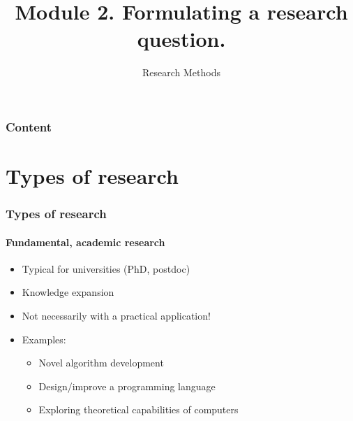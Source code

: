 \documentclass[aspectratio=169]{beamer}
\title{Module 2. Formulating a research question.}
\subtitle{Research Methods}
\author{\lecturers}   %
\date{\academicyear}
\begin{document}
    
    \begin{frame}
        \maketitle
    \end{frame}
    
    \begin{frame}
        \frametitle{Content}
        
        \tableofcontents
    \end{frame}
    
    \section{Types of research}
    
    \begin{frame}
        \frametitle{Types of research}
        \framesubtitle{Fundamental, academic research}
        
        \begin{itemize}
            \item Typical for universities (PhD, postdoc)
            \item Knowledge expansion
            \item Not necessarily with a practical application!
            \item Examples:
            \begin{itemize}
                \item Novel algorithm development
                \item Design/improve a programming language
                \item Exploring theoretical capabilities of computers
            \end{itemize}
        \end{itemize}
        
    \end{frame}
    
\end{document}
